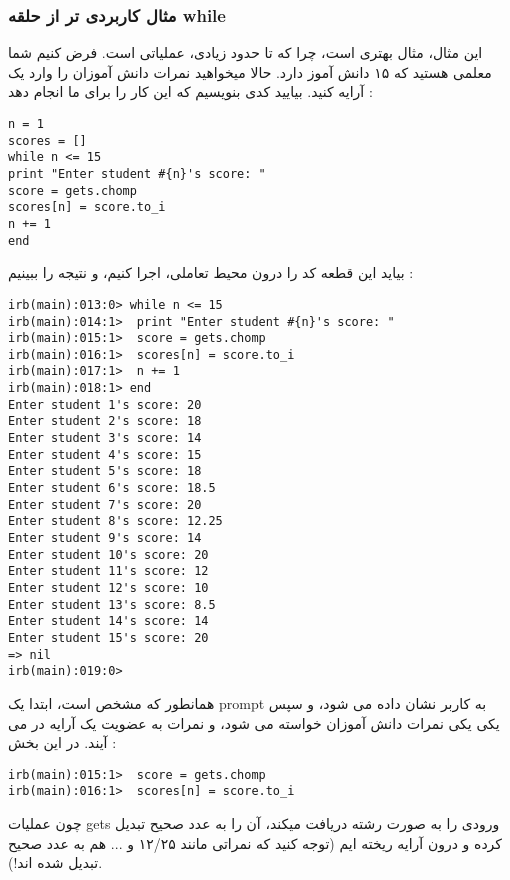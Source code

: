 \documentclass[11pt]{article}
\begin{document}
\subsubsection{مثال کاربردی تر از حلقه while}
این مثال، مثال بهتری است، چرا که تا حدود زیادی، عملیاتی است. فرض کنیم شما معلمی هستید که ۱۵ دانش آموز دارد. حالا میخواهید نمرات دانش آموزان را وارد یک آرایه کنید. بیایید کدی بنویسیم که این کار را برای ما انجام دهد :
\begin{latin}
\begin{verbatim}
n = 1
scores = []
while n <= 15
print "Enter student #{n}'s score: "
score = gets.chomp
scores[n] = score.to_i
n += 1
end
\end{verbatim}
\end{latin}
بیاید این قطعه کد را درون محیط تعاملی، اجرا کنیم، و نتیجه را ببینیم :
\begin{latin}
\begin{verbatim}
irb(main):013:0> while n <= 15
irb(main):014:1>  print "Enter student #{n}'s score: "
irb(main):015:1>  score = gets.chomp
irb(main):016:1>  scores[n] = score.to_i
irb(main):017:1>  n += 1
irb(main):018:1> end
Enter student 1's score: 20
Enter student 2's score: 18
Enter student 3's score: 14
Enter student 4's score: 15
Enter student 5's score: 18
Enter student 6's score: 18.5
Enter student 7's score: 20
Enter student 8's score: 12.25
Enter student 9's score: 14
Enter student 10's score: 20
Enter student 11's score: 12
Enter student 12's score: 10
Enter student 13's score: 8.5
Enter student 14's score: 14
Enter student 15's score: 20
=> nil
irb(main):019:0> 
\end{verbatim}
\end{latin}
همانطور که مشخص است، ابتدا یک prompt به کاربر نشان داده می شود، و سپس یکی یکی نمرات دانش آموزان خواسته می شود، و نمرات به عضویت یک آرایه در می آیند. در این بخش :
\begin{latin}
\begin{verbatim}
irb(main):015:1>  score = gets.chomp
irb(main):016:1>  scores[n] = score.to_i
\end{verbatim}
\end{latin}
چون عملیات gets ورودی را به صورت رشته دریافت میکند، آن را به عدد صحیح تبدیل کرده و درون آرایه ریخته ایم (توجه کنید که نمراتی مانند ۱۲/۲۵ و ... هم به عدد صحیح تبدیل شده اند!). 
\end{document}

